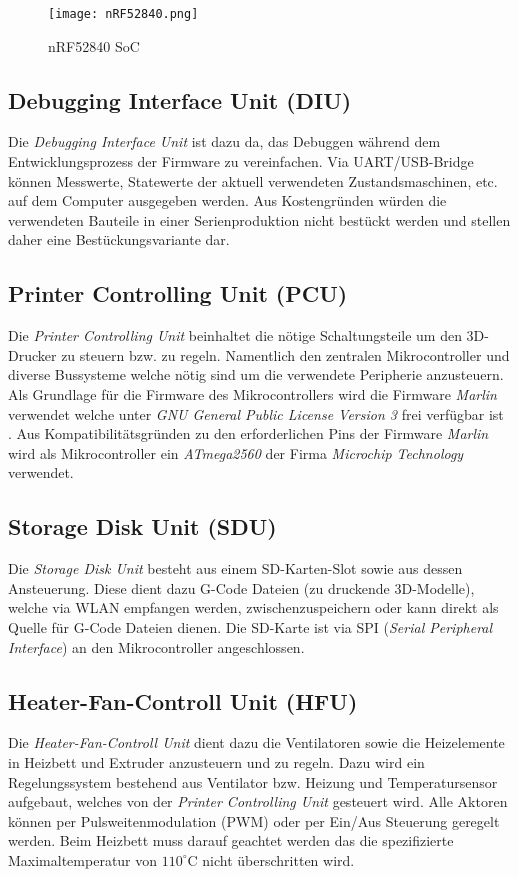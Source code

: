 \begin{figure}[h]
	\centering
	\texttt{[image: nRF52840.png]}
	\caption{nRF52840 SoC}
	\label{img:nRF52840}
\end{figure} 

\subsection{Debugging Interface Unit (DIU)}\label{subsec:DIU}
Die \textit{Debugging Interface Unit} ist dazu da, das Debuggen während dem Entwicklungsprozess der Firmware zu vereinfachen. Via UART/USB-Bridge können Messwerte, Statewerte der aktuell verwendeten Zustandsmaschinen, etc. auf dem Computer ausgegeben werden. Aus Kostengründen würden die verwendeten Bauteile in einer Serienproduktion nicht bestückt werden und stellen daher eine Bestückungsvariante dar.

\subsection{Printer Controlling Unit (PCU)}\label{subsec:PCU}
Die \textit{Printer Controlling Unit} beinhaltet die nötige Schaltungsteile um den 3D-Drucker zu steuern bzw. zu regeln. Namentlich den zentralen Mikrocontroller und diverse Bussysteme welche nötig sind um die verwendete Peripherie anzusteuern. Als Grundlage für die Firmware des Mikrocontrollers wird die Firmware \textit{Marlin} verwendet \cite{marlin_webseite} welche unter \textit{GNU General Public License Version 3} frei verfügbar ist \cite{marlin_gnu_lizenz}. Aus Kompatibilitätsgründen zu den erforderlichen Pins der Firmware \textit{Marlin} wird als Mikrocontroller ein \textit{ATmega2560} \cite{ATmega2560_spezifiaktion} der Firma \textit{Microchip Technology} verwendet.

\subsection{Storage Disk Unit (SDU)}\label{subsec:SDU}
Die \textit{Storage Disk Unit} besteht aus einem SD-Karten-Slot sowie aus dessen Ansteuerung. Diese dient dazu G-Code Dateien (zu druckende 3D-Modelle), welche via WLAN empfangen werden, zwischenzuspeichern oder kann direkt als Quelle für G-Code Dateien dienen. Die SD-Karte ist via SPI (\textit{Serial Peripheral Interface}) an den Mikrocontroller angeschlossen. 

\subsection{Heater-Fan-Controll Unit (HFU)}\label{subsec:HFU}
Die \textit{Heater-Fan-Controll Unit} dient dazu die Ventilatoren sowie die Heizelemente in Heizbett und Extruder anzusteuern und zu regeln. Dazu wird ein Regelungssystem bestehend aus Ventilator bzw. Heizung und Temperatursensor aufgebaut, welches von der \textit{Printer Controlling Unit} gesteuert wird. Alle Aktoren können per Pulsweitenmodulation (PWM) oder per Ein/Aus Steuerung geregelt werden. Beim Heizbett muss darauf geachtet werden das die spezifizierte Maximaltemperatur von $110^\circ$C \cite{ender3_spezifiaktion} nicht überschritten wird.

